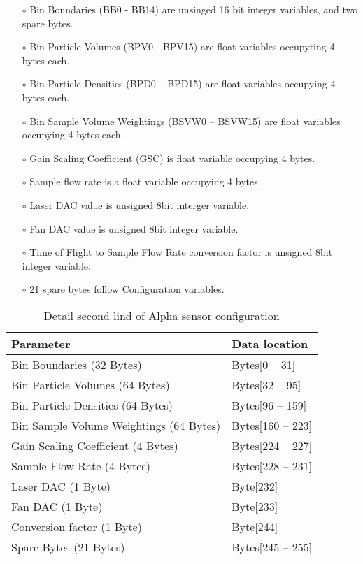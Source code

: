 \begin{itemize}
\setlength\itemsep{0em}
\item[$\circ$] Bin Boundaries (BB0 - BB14) are unsinged 16 bit integer variables, and two spare bytes.
\item[$\circ$] Bin Particle Volumes (BPV0 - BPV15) are float variables occupyting 4 bytes each.
\item[$\circ$] Bin Particle Densities (BPD0 -- BPD15) are float variables occupying 4 bytes each.
\item[$\circ$] Bin Sample Volume Weightings (BSVW0 -- BSVW15) are float variables occupying 4 bytes each.
\item[$\circ$] Gain Scaling Coefficient (GSC) is float variable occupying 4 bytes.
\item[$\circ$] Sample flow rate is a float variable occupying 4 bytes.
\item[$\circ$] Laser DAC value is unsigned 8bit interger variable.
\item[$\circ$] Fan DAC value is unsigned 8bit integer variable.
\item[$\circ$] Time of Flight to Sample Flow Rate conversion factor is unsigned 8bit integer variable.
\item[$\circ$] 21 spare bytes follow Configuration variables.
\end{itemize}


\makeatletter
\setlength{\@fptop}{0pt}
\makeatother

\begin{table}[h!]
    \centering
    \caption{Detail second lind of Alpha sensor configuration}
    \begin{tabular}{|>{\centering\arraybackslash}p{}|>{\centering\arraybackslash}p{}|}
        \hline
        \rowcolor{black!8}
        \textbf{Parameter} & \textbf{Data location}\\ \hline
        Bin Boundaries (32 Bytes) & Bytes[0 -- 31] \\ \hline
        Bin Particle Volumes (64 Bytes) & Bytes[32 -- 95] \\ \hline
        Bin Particle Densities (64 Bytes) & Bytes[96 -- 159] \\ \hline
        Bin Sample Volume Weightings (64 Bytes) & Bytes[160 -- 223] \\ \hline
        Gain Scaling Coefficient (4 Bytes) & Bytes[224 -- 227] \\ \hline
        Sample Flow Rate (4 Bytes) & Bytes[228 -- 231] \\ \hline
        Laser DAC (1 Byte) & Byte[232] \\ \hline
        Fan DAC (1 Byte) & Byte[233] \\ \hline
        Conversion factor (1 Byte) & Byte[244] \\ \hline
        Spare Bytes (21 Bytes) & Bytes[245 -- 255] \\ \hline
    \end{tabular}
\end{table}

\clearpage